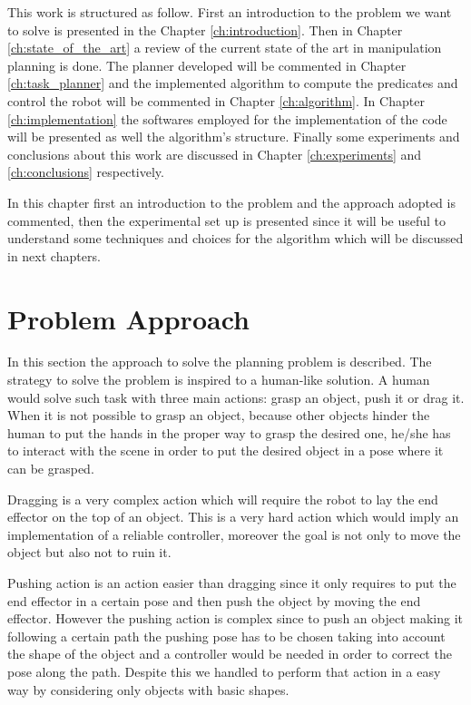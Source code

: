 This work is structured as follow. First an introduction to the problem we want to solve is presented in the Chapter \ref{ch:introduction}. Then in Chapter \ref{ch:state_of_the_art} a review of the current state of the art in manipulation planning is done. The planner developed will be commented in Chapter \ref{ch:task_planner} and the implemented algorithm to compute the predicates and control the robot will be commented in Chapter \ref{ch:algorithm}. In Chapter \ref{ch:implementation} the softwares employed for the implementation of the code will be presented as well the algorithm's structure. Finally some experiments and conclusions about this work are discussed in Chapter \ref{ch:experiments} and \ref{ch:conclusions} respectively.

In this chapter first an introduction to the problem and the approach adopted is commented, then the experimental set up is presented since it will be useful to understand some techniques and choices for the algorithm which will be discussed in next chapters. 

\section{Problem Approach}
In this section the approach to solve the planning problem is described. The strategy to solve the problem is inspired to a human-like solution. A human would solve such task with three main actions: grasp an object, push it or drag it. When it is not possible to grasp an object, because other objects hinder the human to put the hands in the proper way to grasp the desired one, he/she has to interact with the scene in order to put the desired object in a pose where it can be grasped.

Dragging is a very complex action which will require the robot to lay the end effector on the top of an object. This is a very hard action which would imply an implementation of a reliable controller, moreover the goal is not only to move the object but also not to ruin it.

Pushing action is an action easier than dragging since it only requires to put the end effector in a certain pose and then push the object by moving the end effector. However the pushing action is complex since to push an object making it following a certain path the pushing pose has to be chosen taking into account the shape of the object and a controller would be needed in order to correct the pose along the path. Despite this we handled to perform that action in a easy way by considering only objects with basic shapes.

